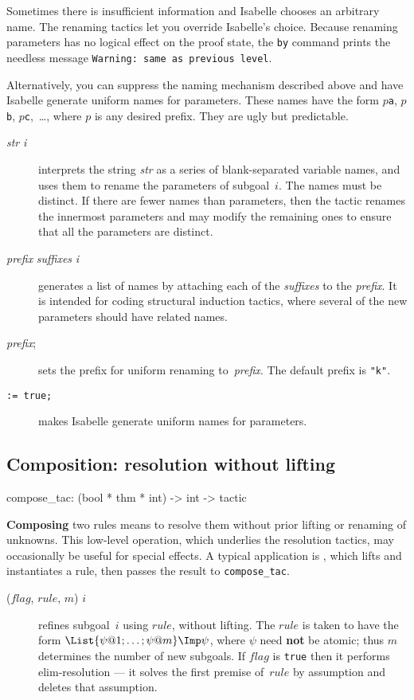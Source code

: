 Sometimes there is insufficient information and Isabelle chooses an
arbitrary name.  The renaming tactics let you override Isabelle's choice.
Because renaming parameters has no logical effect on the proof state, the
{\tt by} command prints the needless message {\tt Warning:\ same as previous
level}.

Alternatively, you can suppress the naming mechanism described above and
have Isabelle generate uniform names for parameters.  These names have the
form $p${\tt a}, $p${\tt b}, $p${\tt c},~\ldots, where $p$ is any desired
prefix.  They are ugly but predictable.

\begin{description}
\item[ {\it str} {\it i}] 
interprets the string {\it str} as a series of blank-separated variable
names, and uses them to rename the parameters of subgoal~$i$.  The names
must be distinct.  If there are fewer names than parameters, then the
tactic renames the innermost parameters and may modify the remaining ones
to ensure that all the parameters are distinct.

\item[ {\it prefix} {\it suffixes} {\it i}] 
generates a list of names by attaching each of the {\it suffixes\/} to the 
{\it prefix}.  It is intended for coding structural induction tactics,
where several of the new parameters should have related names.

\item[ {\it prefix};] 
sets the prefix for uniform renaming to~{\it prefix}.  The default prefix
is {\tt"k"}.

\item[ \tt:= true;] 
makes Isabelle generate uniform names for parameters. 
\end{description}


\subsection{Composition: resolution without lifting}
\begin{ttbox}
compose_tac: (bool * thm * int) -> int -> tactic
\end{ttbox}
{\bf Composing} two rules means to resolve them without prior lifting or
renaming of unknowns.  This low-level operation, which underlies the
resolution tactics, may occasionally be useful for special effects.
A typical application is , which lifts and instantiates a
rule, then passes the result to {\tt compose_tac}.
\begin{description}
\item[ ($flag$, $rule$, $m$) $i$] 
refines subgoal~$i$ using $rule$, without lifting.  The $rule$ is taken to
have the form $\List{\psi@1; \ldots; \psi@m} \Imp \psi$, where $\psi$ need
{\bf not} be atomic; thus $m$ determines the number of new subgoals.  If
$flag$ is {\tt true} then it performs elim-resolution --- it solves the
first premise of~$rule$ by assumption and deletes that assumption.
\end{description}


